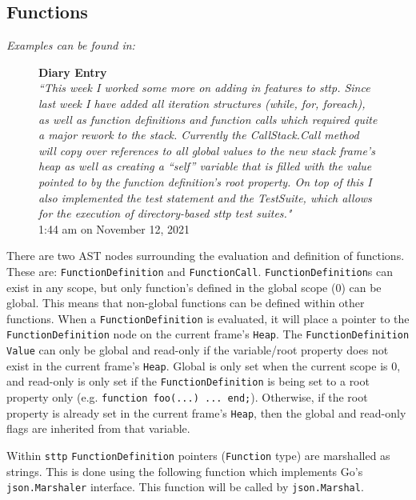 \subsection{Functions}

\textit{Examples can be found in: }

\begin{figure}[H]
    \begin{center}
        \textbf{Diary Entry}\\[0.5em]
        \textit{``This week I worked some more on adding in features to sttp. Since last week I have added all iteration structures (while, for, foreach), as well as function definitions and function calls which required quite a major rework to the stack. Currently the CallStack.Call method will copy over references to all global values to the new stack frame’s heap as well as creating a “self” variable that is filled with the value pointed to by the function definition’s root property. On top of this I also implemented the test statement and the TestSuite, which allows for the execution of directory-based sttp test suites."}\\[0.5em]
        \tiny{1:44 am on November 12, 2021}
    \end{center}
\end{figure}

There are two AST nodes surrounding the evaluation and definition of functions. These are: \verb|FunctionDefinition| and \verb|FunctionCall|. \verb|FunctionDefinition|s can exist in any scope, but only function's defined in the global scope ($0$) can be global. This means that non-global functions can be defined within other functions. When a \verb|FunctionDefinition| is evaluated, it will place a pointer to the \verb|FunctionDefinition| node on the current frame's \verb|Heap|. The \verb|FunctionDefinition| \verb|Value| can only be global and read-only if the variable/root property does not exist in the current frame's \verb|Heap|. Global is only set when the current scope is 0, and read-only is only set if the \verb|FunctionDefinition| is being set to a root property only (e.g. \verb|function foo(...) ... end;|). Otherwise, if the root property is already set in the current frame's \verb|Heap|, then the global and read-only flags are inherited from that variable.

Within \verb|sttp| \verb|FunctionDefinition| pointers (\verb|Function| type) are marshalled as strings. This is done using the following function which implements Go's \verb|json.Marshaler| interface. This function will be called by \verb|json.Marshal|.


